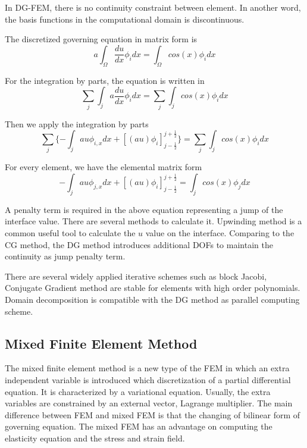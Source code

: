 In DG-FEM, there is no continuity constraint between element. In another word, the basis functions in the computational domain is discontinuous.

The discretized governing equation in matrix form is
\begin{equation}
a \int_{\Omega} \frac{du}{dx} \phi_{i}  dx = \int_{\Omega} cos(x) \phi_{i} dx
\end{equation}

For the integration by parts, the equation is written in
\begin{equation}
\sum_{j} \int_{j} a \frac{du}{dx} \phi_{i} dx = \sum_{j} \int_{j} cos(x) \phi_{i} dx
\end{equation}

Then we apply the integration by parts
\begin{equation}
\sum_{j} \{ -\int_{j} a u \phi_{i, x} dx + [(a u)\phi_{i}]^{j + \frac{1}{2}}_{j - \frac{1}{2}} \} = \sum_{j} \int_{j} cos(x) \phi_{i} dx
\end{equation}

For every element, we have the elemental matrix form 
\begin{equation}
-\int_{j} au\phi_{j,x} dx + [(au)\phi_{i}]^{j + \frac{1}{2}}_{j - \frac{1}{2}} = \int_{j} cos(x) \phi_{j} dx
\end{equation}

A penalty term is required in the above equation representing a jump of the interface value. There are several methods to calculate it. Upwinding method is a common useful tool to calculate the $ u $ value on the interface. Comparing to the CG method, the DG method introduces additional DOFs to maintain the continuity as jump penalty term. 

There are several widely applied iterative schemes such as block Jacobi, Conjugate Gradient method are stable for elements with high order polynomials. Domain decomposition is compatible with the DG method as parallel computing scheme.


\subsection{Mixed Finite Element Method}

The mixed finite element method is a new type of the FEM in which an extra independent variable is introduced which discretization of a partial differential equation. It is characterized by a variational equation. Usually, the extra variables are constrained by an external vector, Lagrange multiplier. The main difference between FEM and mixed FEM is that the changing of bilinear form of governing equation. The mixed FEM has an advantage on computing the elasticity equation and the stress and strain field. 

